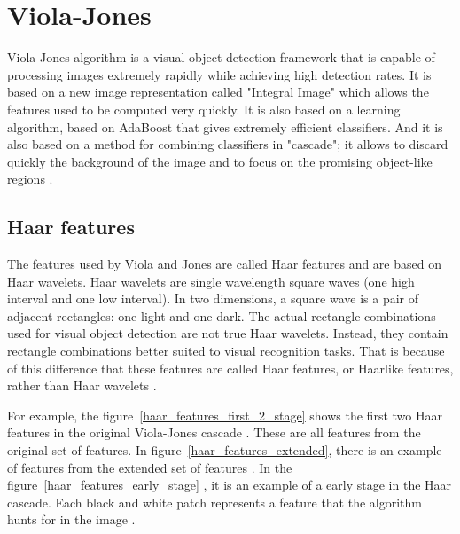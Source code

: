 \chapter{Viola-Jones}

\noindent Viola-Jones algorithm is a visual object detection framework that is capable of processing images extremely rapidly while achieving high detection rates. It is based on a new image representation called "Integral Image" which allows the features used to be computed very quickly. It is also based on a learning algorithm, based on AdaBoost that gives extremely efficient classifiers. And it is also based on a method for combining classifiers in "cascade"; it allows to discard quickly the background of the image and to focus on the promising object-like regions \cite{VIO01}.
\newline

\section{Haar features}

\vspace{\baselineskip}
\noindent The features used by Viola and Jones are called Haar features and are based on Haar wavelets. Haar wavelets are single wavelength square waves (one high interval and one low interval). In two dimensions, a square wave is a pair of adjacent rectangles: one light and one dark. The actual rectangle combinations used for visual object detection are not true Haar wavelets. Instead, they contain rectangle combinations better suited to visual recognition tasks. That is because of this difference that these features are called Haar features, or Haarlike features, rather than Haar wavelets \cite{HEW07}.
\newline

\noindent For example, the figure~\ref{haar_features_first_2_stage} shows the first two Haar features in the original Viola-Jones cascade \cite{HEW07}. These are all features from the original set of features. In figure~\ref{haar_features_extended}, there is an example of features from the extended set of features \cite{DIN08}. In the figure~\ref{haar_features_early_stage} , it is an example of a early stage in the Haar cascade. Each black and white patch represents a feature that the algorithm hunts for in the image \cite{HAR12}.
\newline

